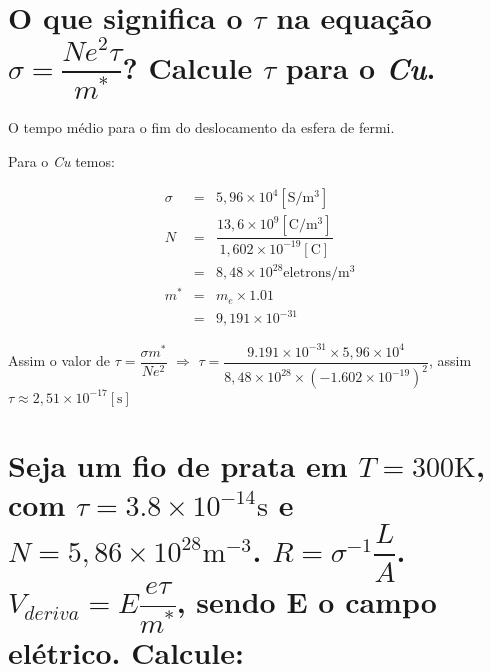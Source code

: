 \section*{O que significa o $\tau$ na equação $\sigma = \dfrac{Ne^{2}\tau}{m^{*}}$?
  Calcule $\tau$ para o \emph{Cu}.}
\label{q11}

O tempo médio para o fim do deslocamento da esfera de fermi.

\vspace*{0.5cm}

Para o \emph{Cu} temos:

\begin{eqnarray*}
  \sigma & = & 5,96 \times 10^{4} [\si{\siemens/\meter^{3}}]\\ \nonumber
  N & = & \dfrac{13,6 \times 10^{9} [\si{\coulomb/\meter^{3}}]}
          {1,602 \times 10^{-19}[\si{\coulomb}]} \\ \nonumber
  & = & 8,48 \times 10^{28} \mathrm{eletrons}/\si{\meter^{3}} \\ \nonumber
  m^{*} & = & m_{e} \times 1.01 \\ \nonumber
  & = & 9,191 \times 10^{-31} \nonumber
\end{eqnarray*}

Assim o valor de $\tau = \dfrac{\sigma m^{*}}{N e^{2}}$ $\Rightarrow$ $\tau = \dfrac{9.191
  \times 10^{-31} \times 5,96 \times 10^{4}}{8,48 \times 10^{28} \times (-1.602 \times 10^{-19})^{2}}$,
assim $\tau \approx 2,51 \times 10^{-17} [\si{\second}]$

\section*{Seja um fio de prata em $T = 300 \si{\kelvin}$, com $\tau = 3.8
  \times 10^{-14} \si{\second}$ e $N = 5,86 \times 10^{28} \si{\meter^{-3}}$. $R
  = \sigma^{-1} \dfrac{L}{A}$. $V_{deriva} = E \dfrac{e \tau}{m^{*}}$, sendo E o campo
  elétrico. Calcule:}
\label{q12}

